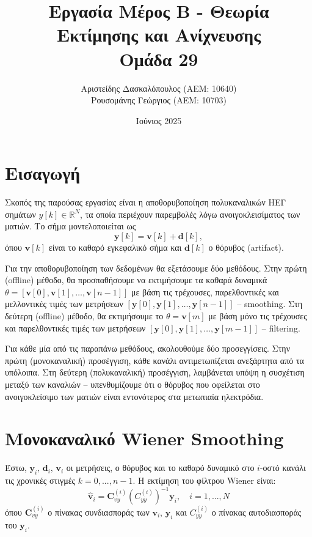 \documentclass[a4paper,12pt]{article}
\title{Εργασία Μέρος Β - Θεωρία Εκτίμησης και Ανίχνευσης \\[0.5cm] Ομάδα 29}
\author{Αριστείδης Δασκαλόπουλος (ΑΕΜ: 10640) \\ Ρουσομάνης Γεώργιος (ΑΕΜ: 10703)}
\date{Ιούνιος 2025}
\begin{document}
\maketitle

\section*{Εισαγωγή}

Σκοπός της παρούσας εργασίας είναι η αποθορυβοποίηση πολυκαναλικών ΗΕΓ σημάτων $y[k] \in \mathbb{R}^N$, τα οποία περιέχουν παρεμβολές λόγω ανοιγοκλεισίματος των ματιών. Το σήμα μοντελοποιείται ως
\[
\mathbf{y}[k] = \mathbf{v}[k] + \mathbf{d}[k],
\]
όπου $\mathbf{v}[k]$ είναι το καθαρό εγκεφαλικό σήμα και $\mathbf{d}[k]$ ο θόρυβος 
(artifact). 

Για την αποθορυβοποίηση των δεδομένων θα εξετάσουμε δύο μεθόδους. Στην πρώτη 
(offline) μέθοδο, θα προσπαθήσουμε να 
εκτιμήσουμε τα καθαρά δυναμικά 
$\theta = [\mathbf{v}[0], \mathbf{v}[1], \ldots, \mathbf{v}[n-1]]$
με βάση τις τρέχουσες, παρελθοντικές και μελλοντικές τιμές των μετρήσεων 
$[\mathbf{y}[0], \mathbf{y}[1], \ldots, \mathbf{y}[n-1]]$ 
-- smoothing. Στη δεύτερη 
(offline) μέθοδο, θα εκτιμήσουμε το 
$\theta = \mathbf{v}[m]$ με βάση μόνο τις τρέχουσες και παρελθοντικές τιμές των μετρήσεων 
$[\mathbf{y}[0], \mathbf{y}[1], \ldots, \mathbf{y}[m-1]]$
-- filtering.

Για κάθε μία από τις παραπάνω μεθόδους, ακολουθούμε δύο προσεγγίσεις. Στην πρώτη (μονοκαναλική) προσέγγιση, 
κάθε κανάλι αντιμετωπίζεται ανεξάρτητα από τα υπόλοιπα. Στη δεύτερη (πολυκαναλική) προσέγγιση, λαμβάνεται 
υπόψη η συσχέτιση μεταξύ των καναλιών – υπενθυμίζουμε ότι ο θόρυβος που οφείλεται στο ανοιγοκλείσιμο των 
ματιών είναι εντονότερος στα μετωπιαία ηλεκτρόδια.

\section*{Μονοκαναλικό Wiener Smoothing}
Έστω, $\mathbf{y}_i, \, \mathbf{d}_i, \, \mathbf{v}_i$
οι μετρήσεις, ο θόρυβος και το καθαρό δυναμικό στο $i$-οστό κανάλι τις χρονικές στιγμές $k=0,...,n-1$. 
Η εκτίμηση του φίλτρου Wiener είναι:
\[
\hat{\mathbf{v}}_i = \mathbf{C}_{vy}^{(i)}\left(C_{yy}^{(i)}\right)^{-1}\mathbf{y}_i, \quad i = 1,...,N
\]
όπου $\mathbf{C}_{vy}^{(i)}$ ο πίνακας συνδιασποράς των $\mathbf{v}_i, \, \mathbf{y}_i$ και $C_{yy}^{(i)}$
ο πίνακας αυτοδιασποράς του $\mathbf{y}_i$.
\end{document}
